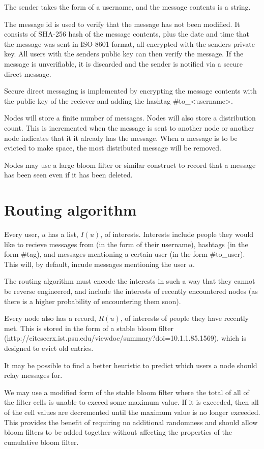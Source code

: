 \documentclass{article}
\begin{document}
The sender takes the form of a username, and the message contents is a string.

The message id is used to verify that the message has not been modified. It consists of SHA-256 hash of the message contents, plus the date and time that the message was sent in ISO-8601 format, all encrypted with the senders private key. All users with the senders public key can then verify the message. If the message is unverifiable, it is discarded and the sender is notified via a secure direct message.

Secure direct messaging is implemented by encrypting the message contents with the public key of the reciever and adding the hashtag \#to\_\textless username\textgreater.

Nodes will store a finite number of messages. Nodes will also store a distribution count. This is incremented when the message is sent to another node or another node indicates that it it already has the message. When a message is to be evicted to make space, the most distributed message will be removed.

Nodes may use a large bloom filter or similar construct to record that a message has been seen even if it has been deleted.


\section*{Routing algorithm}
Every user, $u$ has a list, $I(u)$, of interests. Interests include people they would like to recieve messages from (in the form of their username), hashtags (in the form \#tag), and messages mentioning a certain user (in the form \#to\_user). This will, by default, incude messages mentioning the user $u$.

The routing algorithm must encode the interests in such a way that they cannot be reverse engineered, and include the interests of recently encountered nodes (as there is a higher probability of encountering them soon).

Every node also has a record, $R(u)$, of interests of people they have recently met. This is stored in the form of a stable bloom filter (http://citeseerx.ist.psu.edu/viewdoc/summary?doi=10.1.1.85.1569), which is designed to evict old entries.

It may be possible to find a better heuristic to predict which users a node should relay messages for.

We may use a modified form of the stable bloom filter where the total of all of the filter cells is unable to exceed some maximum value. If it is exceeded, then all of the cell values are decremented until the maximum value is no longer exceeded. This provides the benefit of requiring no additional randomness and should allow bloom filters to be added together without affecting the properties of the cumulative bloom filter.
\end{document}
